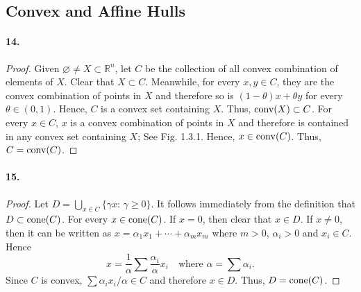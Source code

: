 \subsection{Convex and Affine Hulls}
  \paragraph{14.}
  \begin{proof}
    Given $\varnothing\ne X\subset\mathbb{R}^n$, let $C$ be the collection of
    all convex combination of elements of $X$. Clear that $X\subset C$. 
    Meanwhile, for every $x,y\in C$, they are the convex combination of points 
    in $X$ and therefore so is $(1-\theta)x+\theta y$ for every $\theta\in(0,
    1)$. Hence, $C$ is a convex set containing $X$. Thus, $\operatorname{conv}(X)\subset C$. 
    For every $x\in C$, $x$ is a convex combination of points in $X$ and 
    therefore is contained in any convex set containing $X$; See Fig. 1.3.1. 
    Hence, $x\in\operatorname{conv}(C)$. Thus, $C=\operatorname{conv}(C)$.
  \end{proof}
  
  \paragraph{15.}
  \begin{proof}
    Let $D=\bigcup_{x\in C}\{\gamma x:\,\gamma\ge 0\}$. It follows immediately
    from the definition that $D\subset\operatorname{cone}(C)$. For every $x\in\operatorname{cone}(C)$. If
    $x=0$, then clear that $x\in D$. If $x\ne 0$, then it can be written as
    $x=\alpha_1x_1+\cdots+\alpha_mx_m$ where $m>0$, $\alpha_i>0$ and $x_i\in 
    C$. Hence
    \[
      x=\frac{1}{\alpha}\sum\frac{\alpha_i}{\alpha}x_i
      \quad\text{where }\alpha=\sum\alpha_i.
    \]
    Since $C$ is convex, $\sum\alpha_ix_i/\alpha\in C$ and therefore $x\in D$.
    Thus, $D=\operatorname{cone}(C)$.
  \end{proof}
  
